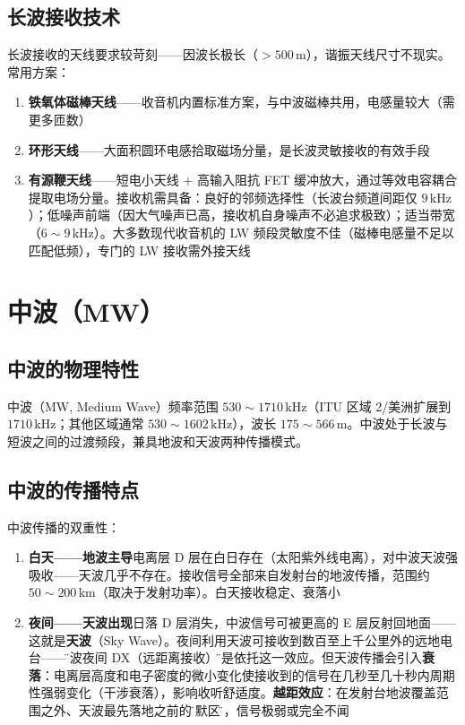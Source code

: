 \documentclass[12pt,UTF8]{ctexbook}
\begin{document}
\subsection{长波接收技术}

长波接收的天线要求较苛刻——因波长极长（$>500\,\mathrm{m}$），谐振天线尺寸不现实。常用方案：
\begin{enumerate}
\item \textbf{铁氧体磁棒天线}——收音机内置标准方案，与中波磁棒共用，电感量较大（需更多匝数）
\item \textbf{环形天线}——大面积圆环电感拾取磁场分量，是长波灵敏接收的有效手段
\item \textbf{有源鞭天线}——短电小天线 + 高输入阻抗 FET 缓冲放大，通过等效电容耦合提取电场分量。接收机需具备：良好的邻频选择性（长波台频道间距仅 $9\,\mathrm{kHz}$）；低噪声前端（因大气噪声已高，接收机自身噪声不必追求极致）；适当带宽（$6\sim9\,\mathrm{kHz}$）。大多数现代收音机的 LW 频段灵敏度不佳（磁棒电感量不足以匹配低频），专门的 LW 接收需外接天线
\end{enumerate}

\section{中波（MW）}
\label{sec:medium_wave}

\subsection{中波的物理特性}

中波（MW, Medium Wave）频率范围 $530\sim1710\,\mathrm{kHz}$（ITU 区域 2/美洲扩展到 $1710\,\mathrm{kHz}$；其他区域通常 $530\sim1602\,\mathrm{kHz}$），波长 $175\sim566\,\mathrm{m}$。中波处于长波与短波之间的过渡频段，兼具地波和天波两种传播模式。

\subsection{中波的传播特点}

中波传播的双重性：
\begin{enumerate}
\item \textbf{白天——地波主导}电离层 D 层在白日存在（太阳紫外线电离），对中波天波强吸收——天波几乎不存在。接收信号全部来自发射台的地波传播，范围约 $50\sim200\,\mathrm{km}$（取决于发射功率）。白天接收稳定、衰落小
\item \textbf{夜间——天波出现}日落 D 层消失，中波信号可被更高的 E 层反射回地面——这就是\textbf{天波}（Sky Wave）。夜间利用天波可接收到数百至上千公里外的远地电台——\"中波夜间 DX（远距离接收）\"正是依托这一效应。但天波传播会引入\textbf{衰落}：电离层高度和电子密度的微小变化使接收到的信号在几秒至几十秒内周期性强弱变化（干涉衰落），影响收听舒适度。\textbf{越距效应}：在发射台地波覆盖范围之外、天波最先落地之前的\"静默区\"内，信号极弱或完全不闻
\end{enumerate}
\end{document}
